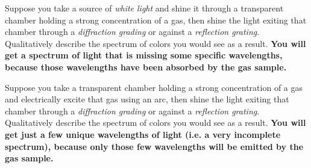 \vskip 10pt

Suppose you take a source of {\it white light} and shine it through a transparent chamber holding a strong concentration of a gas, then shine the light exiting that chamber through a {\it diffraction grading} or against a {\it reflection grating}.  Qualitatively describe the spectrum of colors you would see as a result.  {\bf You will get a spectrum of light that is missing some specific wavelengths, because those wavelengths have been absorbed by the gas sample.}

\vskip 10pt

Suppose you take a transparent chamber holding a strong concentration of a gas and electrically excite that gas using an arc, then shine the light exiting that chamber through a {\it diffraction grading} or against a {\it reflection grating}.  Qualitatively describe the spectrum of colors you would see as a result.  {\bf You will get just a few unique wavelengths of light (i.e. a very incomplete spectrum), because only those few wavelengths will be emitted by the gas sample.}






